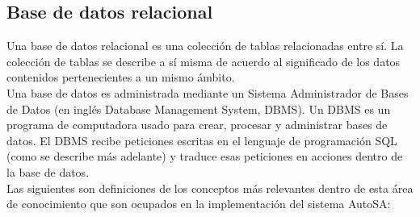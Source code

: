 \subsection{Base de datos relacional}\label{sec:bd-r}
Una base de datos relacional es una colección de tablas relacionadas entre sí. La colección de tablas se describe a sí misma de acuerdo al significado de los datos contenidos pertenecientes a un mismo ámbito\cite{DataBaseConcepts}.\\
Una base de datos es administrada mediante un Sistema Administrador de Bases de Datos (en inglés Database Management System, DBMS). Un DBMS es un programa de computadora usado para crear, procesar y administrar bases de datos. El DBMS recibe peticiones escritas en el lenguaje de programación SQL (como se describe más adelante) y traduce esas peticiones en acciones dentro de la base de datos\cite{DataBaseConcepts}.\\
Las siguientes son definiciones de los conceptos más relevantes dentro de esta área de conocimiento que son ocupados en la implementación del sistema AutoSA:
